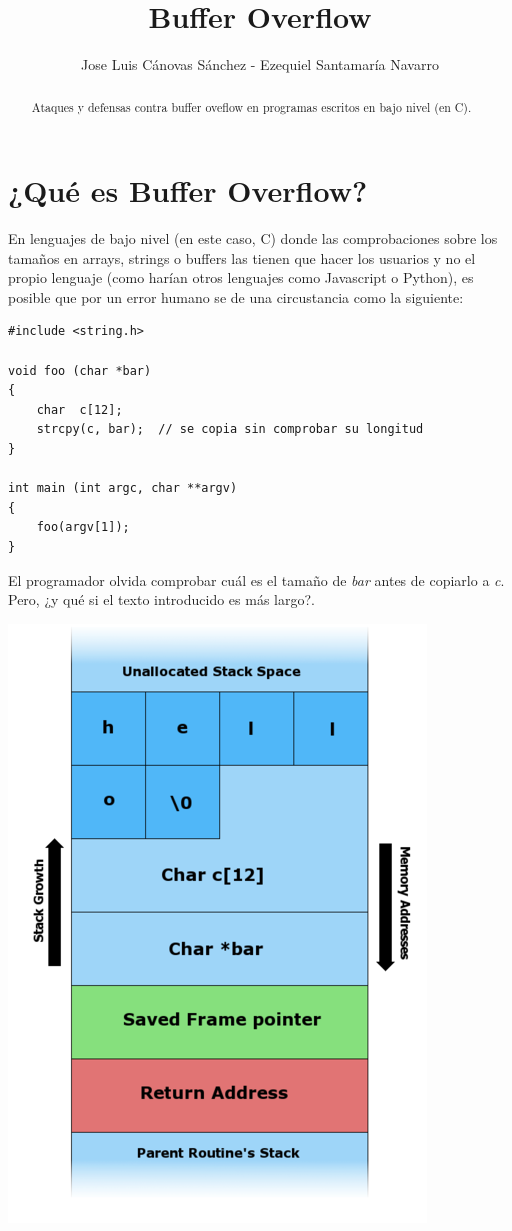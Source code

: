 \documentclass[]{article}
\author{Jose Luis Cánovas Sánchez - Ezequiel Santamaría Navarro}
\title{Buffer Overflow}
\begin{document}
\maketitle

\begin{abstract}
	Ataques y defensas contra buffer oveflow en programas escritos en bajo nivel (en C).
\end{abstract}

\tableofcontents

\newpage

\section{¿Qué es Buffer Overflow?}

En lenguajes de bajo nivel (en este caso, C) donde las comprobaciones sobre los tamaños en arrays, strings o buffers las tienen que hacer los usuarios y no el propio lenguaje (como harían otros lenguajes como Javascript o Python), es posible que por un error humano se de una circustancia como la siguiente:

\begin{lstlisting}
#include <string.h>

void foo (char *bar)
{
	char  c[12];
	strcpy(c, bar);  // se copia sin comprobar su longitud
}

int main (int argc, char **argv)
{
	foo(argv[1]);
}
\end{lstlisting}

El programador olvida comprobar cuál es el tamaño de \textit{bar} antes de copiarlo a \textit{c}. Pero, ¿y qué si el texto introducido es más largo?.

\begin{center}
\includegraphics[width=0.5\linewidth]{so}
\end{center}
\end{document}
